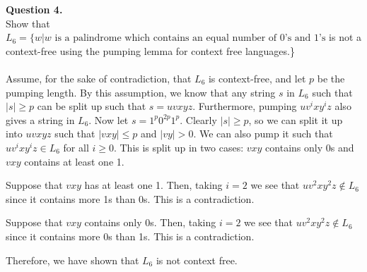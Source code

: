 \documentclass{article}
\newcommand{\set}[1]{\{#1\}}
\newenvironment{question}[2]
{
    {\large \textbf{Question #1.}}\\
    #2\\\\
}{\newpage}
\begin{document}
\begin{question}
    {4}
    {Show that $L_6 = \set{w | w \text{ is a palindrome which contains an equal number of 0's and 1's}$ is not a context-free using the pumping lemma for
            context free languages.}
        }
        Assume, for the sake of contradiction, that $L_6$ is context-free, and let $p$ be the pumping length. By this assumption, we know that any string $s$ in
    $L_6$ such that $|s| \geq p$ can be split up such that $s = uvxyz$. Furthermore, pumping $uv^ixy^iz$ also gives a string in $L_6$. Now let
    $s = 1^p0^{2p}1^p$. Clearly $|s| \geq p$, so we can split it up into $uvxyz$ such that $|vxy| \leq p$ and $|vy| > 0$. We can also pump it such that
    $uv^ixy^iz \in L_6$ for all $i \geq 0$. This is split up in two cases: $vxy$ contains only 0s and $vxy$ contains at least one 1.

        Suppose that $vxy$ has at least one 1. Then, taking $i = 2$ we see that $uv^2xy^2z \not\in L_6$ since it contains more 1s than 0s. This is a contradiction.

        Suppose that $vxy$ contains only 0s. Then, taking $i = 2$ we see that $uv^2xy^2z \not\in L_6$ since it contains more 0s than 1s. This is a contradiction.

        Therefore, we have shown that $L_6$ is not context free.
\end{question}
\end{document}
